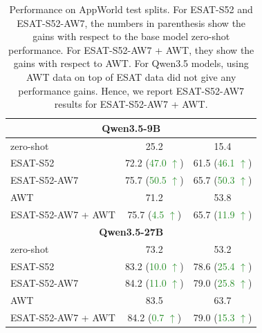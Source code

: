 \begin{table}[t!]
\begin{minipage}[b]{0.49\linewidth}
{\begin{tabular}[b]{lcc}
\multicolumn{3}{c}{\bf Qwen3.5-9B}\\
\midrule
zero-shot                  & 25.2  & 15.4 \\
\textsc{ESAT-S52} & {72.2} (\textcolor{ForestGreen}{47.0 $\uparrow$}) &  {61.5} (\textcolor{ForestGreen}{46.1 $\uparrow$}) \\
\textsc{ESAT-S52-AW7} & {75.7} (\textcolor{ForestGreen}{50.5 $\uparrow$}) &  {65.7} (\textcolor{ForestGreen}{50.3 $\uparrow$})\\
\midrule
\textsc{AWT}                 & 71.2 & 53.8 \\
\textsc{ESAT-S52-AW7 + AWT} & {75.7} (\textcolor{ForestGreen}{4.5 $\uparrow$})  &  {65.7} (\textcolor{ForestGreen}{11.9 $\uparrow$})\\
\midrule


\multicolumn{3}{c}{\bf Qwen3.5-27B}\\
\midrule
zero-shot                  & 73.2 & 53.2 \\
\textsc{ESAT-S52} & {83.2} (\textcolor{ForestGreen}{10.0 $\uparrow$}) &  {78.6} (\textcolor{ForestGreen}{25.4 $\uparrow$}) \\
\textsc{ESAT-S52-AW7} & {84.2} (\textcolor{ForestGreen}{11.0 $\uparrow$}) &  {79.0} (\textcolor{ForestGreen}{25.8 $\uparrow$})\\
\midrule
\textsc{AWT}                 & 83.5 & 63.7 \\
\textsc{ESAT-S52-AW7 + AWT} & {84.2} (\textcolor{ForestGreen}{0.7 $\uparrow$})  &  {79.0} (\textcolor{ForestGreen}{15.3 $\uparrow$})\\
\bottomrule
\end{tabular}
}
\end{minipage}
\caption{Performance on AppWorld test splits. For ESAT-S52 and ESAT-S52-AW7, the numbers in parenthesis show the gains with respect to the base model zero-shot performance. For ESAT-S52-AW7 + AWT, they show the gains with respect to AWT. For Qwen3.5 models, using AWT data on top of ESAT data did not give any performance gains. Hence, we report ESAT-S52-AW7 results for ESAT-S52-AW7 + AWT.}
\label{tab:appworld_main_results}
\end{table}

